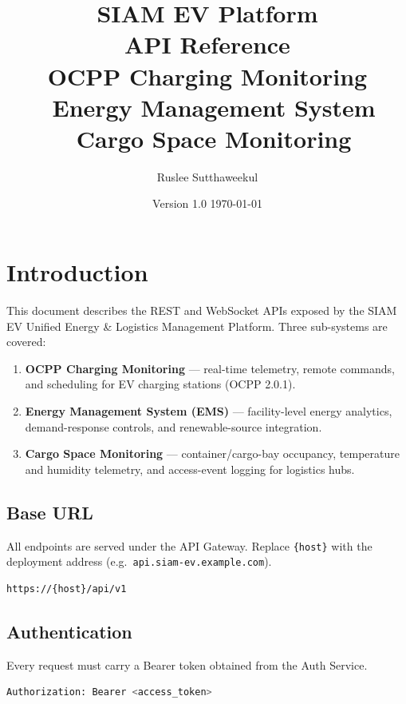 \documentclass{article}
\title{%
    \textbf{SIAM EV Platform}\\[6pt]
    \large API Reference\\
    \normalsize OCPP Charging Monitoring \textbullet\
    Energy Management System \textbullet\
    Cargo Space Monitoring
}
\author{Ruslee Sutthaweekul}
\date{Version 1.0 \quad\textbullet\quad \today}
\begin{document}
\maketitle
\tableofcontents
\newpage

\section{Introduction}

This document describes the REST and WebSocket APIs exposed by the SIAM EV Unified
Energy \& Logistics Management Platform. Three sub-systems are covered:

\begin{enumerate}
    \item \textbf{OCPP Charging Monitoring} --- real-time telemetry, remote commands,
          and scheduling for EV charging stations (OCPP 2.0.1).
    \item \textbf{Energy Management System (EMS)} --- facility-level energy analytics,
          demand-response controls, and renewable-source integration.
    \item \textbf{Cargo Space Monitoring} --- container/cargo-bay occupancy, temperature
          and humidity telemetry, and access-event logging for logistics hubs.
\end{enumerate}

\subsection{Base URL}

All endpoints are served under the API Gateway. Replace \texttt{\{host\}} with the
deployment address (e.g.\ \texttt{api.siam-ev.example.com}).

\begin{lstlisting}[language=bash, caption=Base URL pattern]
https://{host}/api/v1
\end{lstlisting}

\subsection{Authentication}

Every request must carry a Bearer token obtained from the Auth Service.

\begin{lstlisting}[language=bash, caption=Authorization header]
Authorization: Bearer <access_token>
\end{lstlisting}
\end{document}
